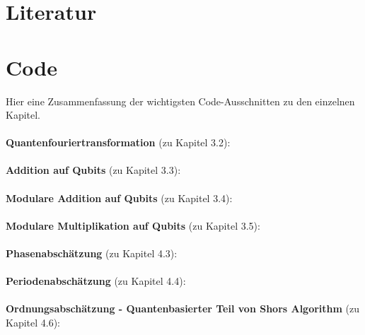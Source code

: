 \section{Literatur}
\printbibliography[heading=none]
\pagebreak
\section{Code}
Hier eine Zusammenfassung der wichtigsten Code-Ausschnitten zu den einzelnen Kapitel.
\paragraph{}

\textbf{Quantenfouriertransformation} (zu Kapitel 3.2):

\paragraph{}

\textbf{Addition auf Qubits} (zu Kapitel 3.3):

\paragraph{}

\textbf{Modulare Addition auf Qubits} (zu Kapitel 3.4):

\paragraph{}

\textbf{Modulare Multiplikation auf Qubits} (zu Kapitel 3.5):

\paragraph{}

\textbf{Phasenabschätzung} (zu Kapitel 4.3):

\paragraph{}

\textbf{Periodenabschätzung} (zu Kapitel 4.4):

\paragraph{}

\textbf{Ordnungsabschätzung - Quantenbasierter Teil von Shors Algorithm} (zu Kapitel 4.6):

\paragraph{}


\addtocounter{page}{-1}
\thispagestyle{empty}
\null\newpage